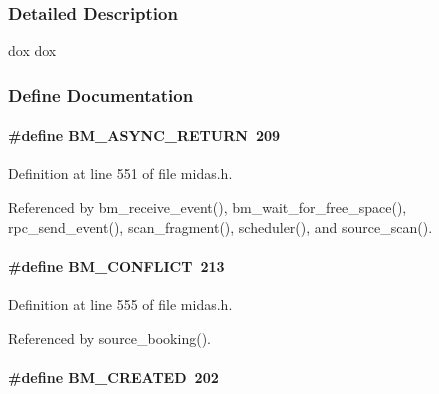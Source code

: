 \subsubsection{Detailed Description}
dox dox 

\subsubsection{Define Documentation}
\paragraph[{BM\_\-ASYNC\_\-RETURN}]{\setlength{\rightskip}{0pt plus 5cm}\#define BM\_\-ASYNC\_\-RETURN~209}\hfill\label{group__err22_ga7fb11aaff606b1785cddd205baddbbff}

\begin{DoxyItemize}
\item 
\end{DoxyItemize}

Definition at line 551 of file midas.h.

Referenced by bm\_\-receive\_\-event(), bm\_\-wait\_\-for\_\-free\_\-space(), rpc\_\-send\_\-event(), scan\_\-fragment(), scheduler(), and source\_\-scan().
\paragraph[{BM\_\-CONFLICT}]{\setlength{\rightskip}{0pt plus 5cm}\#define BM\_\-CONFLICT~213}\hfill\label{group__err22_ga0703bfd174e660aba961c696766e7066}

\begin{DoxyItemize}
\item 
\end{DoxyItemize}

Definition at line 555 of file midas.h.

Referenced by source\_\-booking().
\paragraph[{BM\_\-CREATED}]{\setlength{\rightskip}{0pt plus 5cm}\#define BM\_\-CREATED~202}\hfill\label{group__err22_gaf4d0ec9887b0864c100b8062d21f4c0b}

